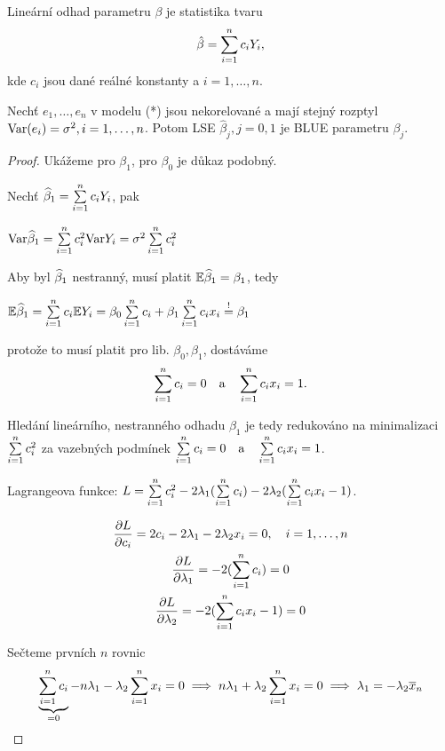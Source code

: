 \begin{define}
	Lineární odhad parametru $\beta$ je statistika tvaru
	\begin{equation*}
		\hat{\beta} = \sum\limits_{i=1}^{n} c_i Y_i,
	\end{equation*}
	kde $c_i$ jsou dané reálné konstanty a $i = 1, \dots, n$.
\end{define}

\begin{theorem}
	Nechť $e_1, \dots, e_n$ v modelu (*) jsou nekorelované a mají stejný rozptyl $\mathrm{Var}(e_i) = \sigma^2, i = 1, \dots, n$. Potom LSE $\hat{\beta}_j, j = 0,1$ je BLUE parametru $\beta_j$.
\end{theorem}

\newcommand{\pd}{\delta}

\begin{proof}
	Ukážeme pro $\beta_1$, pro $\beta_0$ je důkaz podobný.
	
	Nechť $\widehat{\beta}_1 = \sum\limits_{i=1}^{n} c_i Y_i$, pak
	
	$\mathrm{Var} \widehat{\beta}_1 = \sum\limits_{i=1}^{n} c_i^2 \mathrm{Var} Y_i = \sigma^2 \sum\limits_{i=1}^{n} c_i^2$
	
	Aby byl $\widehat{\beta}_1$ nestranný, musí platit $\mathbb{E} \widehat{\beta}_1 = \beta_1$, tedy
	
	$\mathbb{E} \widehat{\beta}_1 = \sum\limits_{i=1}^{n} c_i \mathbb{E} Y_i = \beta_0 \sum\limits_{i=1}^{n} c_i + \beta_1 \sum\limits_{i=1}^{n} c_i x_i \overset{!}{=} \beta_1$
	
	protože to musí platit pro lib. $\beta_0, \beta_1$, dostáváme
	\begin{equation*}
		\sum\limits_{i=1}^{n} c_i = 0 \quad \text{a} \quad \sum\limits_{i=1}^{n} c_i x_i = 1.
	\end{equation*}
	
	Hledání lineárního, nestranného odhadu $\beta_1$ je tedy redukováno na minimalizaci $\sum\limits_{i=1}^{n} c_i^2$ za vazebných podmínek $\sum\limits_{i=1}^{n} c_i = 0 \quad \text{a} \quad \sum\limits_{i=1}^{n} c_i x_i = 1$.
	
	Lagrangeova funkce: $L = \sum\limits_{i=1}^{n} c_i^2 - 2 \lambda_1 (\sum\limits_{i=1}^{n} c_i) - 2 \lambda_2 (\sum\limits_{i=1}^{n} c_i x_i - 1)$.
	
	\begin{gather*}
		\frac{\partial L}{\partial c_i} = 2 c_i - 2 \lambda_1 - 2 \lambda_2 x_i = 0, \quad i = 1, \dots, n \\
		\frac{\partial L}{\partial \lambda_1} = -2 (\sum\limits_{i=1}^{n} c_i) = 0 \\
		\frac{\partial L}{\partial \lambda_2} = -2 (\sum\limits_{i=1}^{n} c_i x_i - 1) = 0
	\end{gather*}
	
	Sečteme prvních $n$ rovnic
	\begin{equation*}
		\underbrace{\sum\limits_{i=1}^{n} c_i}_{= 0} - n \lambda_1 - \lambda_2 \sum\limits_{i=1}^{n} x_i = 0 \implies n\lambda_1 + \lambda_2 \sum\limits_{i=1}^{n} x_i = 0 \implies \lambda_1 = - \lambda_2 \overline{x}_n
	\end{equation*}
	

\end{proof}
